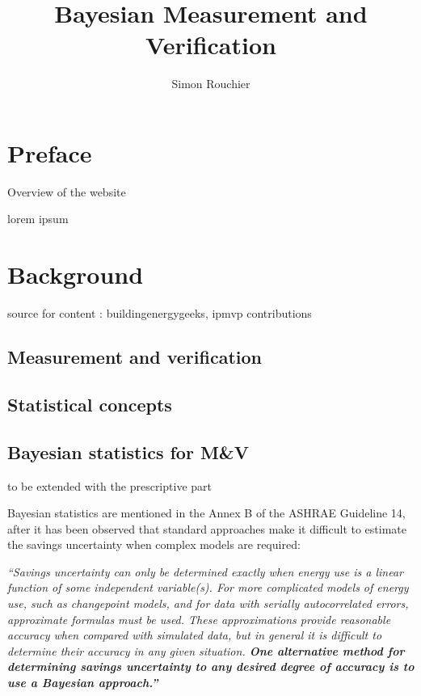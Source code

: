 \documentclass[
]{article}
\title{Bayesian Measurement and Verification}
\author{Simon Rouchier}
\date{}
\begin{document}
\maketitle

{
\setcounter{tocdepth}{2}
\tableofcontents
}
\hypertarget{preface}{%
\section*{Preface}\label{preface}}

Overview of the website

lorem ipsum

\hypertarget{background}{%
\section{Background}\label{background}}

source for content : buildingenergygeeks, ipmvp contributions

\hypertarget{measurement-and-verification}{%
\subsection{Measurement and verification}\label{measurement-and-verification}}

\hypertarget{statistical-concepts}{%
\subsection{Statistical concepts}\label{statistical-concepts}}

\hypertarget{bayesian-statistics-for-mv}{%
\subsection{Bayesian statistics for M\&V}\label{bayesian-statistics-for-mv}}

to be extended with the prescriptive part

Bayesian statistics are mentioned in the Annex B of the ASHRAE Guideline 14, after it has been observed that standard approaches make it difficult to estimate the savings uncertainty when complex models are required:

\emph{``Savings uncertainty can only be determined exactly when energy use is a linear function of some independent variable(s). For more complicated models of energy use, such as changepoint models, and for data with serially autocorrelated errors, approximate formulas must be used. These approximations provide reasonable accuracy when compared with simulated data, but in general it is difficult to determine their accuracy in any given situation. \textbf{One alternative method for determining savings uncertainty to any desired degree of accuracy is to use a Bayesian approach.''} }
\end{document}
